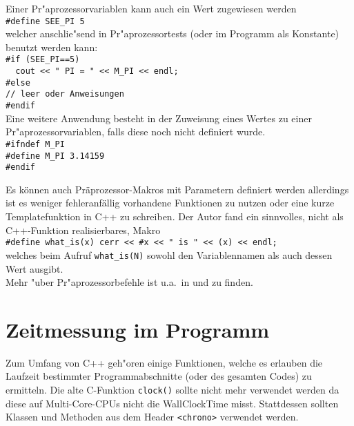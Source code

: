 Einer Pr"aprozessorvariablen kann auch ein Wert zugewiesen werden 
\\[0.5ex]
\verb|#define SEE_PI 5|
\\[0.5ex]
welcher anschlie"send in Pr"aprozessortests (oder im Programm 
als Konstante) benutzt werden kann:
\\[0.5ex]
\verb|#if (SEE_PI==5)|	\\
\verb|  cout << " PI = " << M_PI << endl;|	\\
\verb|#else|	\\
\verb|// leer oder Anweisungen|	\\
\verb|#endif|
\\[0.5ex] 
Eine weitere Anwendung besteht in der Zuweisung eines Wertes zu einer 
Pr"aprozessorvariablen, falls diese noch nicht definiert wurde.
\\[0.5ex]
\verb|#ifndef M_PI|	\\
\verb|#define M_PI 3.14159|	\\
\verb|#endif|

Es können auch Präprozessor-Makros mit Parametern definiert werden
allerdings ist es weniger fehleranfällig vorhandene Funktionen zu nutzen oder 
eine kurze Templatefunktion in C++ zu schreiben.
Der Autor fand ein sinnvolles, nicht als C++-Funktion realisierbares, Makro
\\[0.5ex]
\verb|#define what_is(x) cerr << #x << " is " << (x) << endl;|
\\[0.5ex]
welches beim Aufruf \verb|what_is(N)| sowohl den Variablennamen als auch dessen Wert ausgibt.
%
\\
Mehr "uber Pr"aprozessorbefehle ist u.a.\  in 
\cite{Gode:1998:ANK} und \cite[\S A.11]{Stroustrup:2000:CPP} 
zu finden. 
%
%
\section{Zeitmessung im Programm}
\label{p:13.2}
%
Zum Umfang von C++ geh"oren einige Funktionen, welche es erlauben 
die Laufzeit bestimmter Programmabschnitte (oder des gesamten Codes) 
zu ermitteln. Die alte C-Funktion \texttt{clock()} sollte nicht mehr verwendet werden
da diese auf Multi-Core-CPUs nicht die WallClockTime misst. 
Stattdessen sollten Klassen und Methoden  
aus dem Header \verb|<chrono>| verwendet werden.


